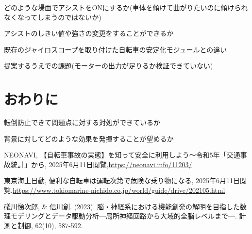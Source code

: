 \documentclass[uplatex,dvipdfmx]{jsarticle}
\begin{document}
どのような場面でアシストをONにするか(車体を傾けて曲がりたいのに傾けられなくなってしまうのではないか)

アシストのしきい値や強さの変更をすることができるか

既存のジャイロスコープを取り付けた自転車の安定化モジュールとの違い

提案するうえでの課題(モーターの出力が足りるか検証できていない)

\section{おわりに}

転倒防止できて問題点に対する対処ができているか

背景に対してどのような効果を発揮することが望めるか




\begin{thebibliography}{9}

 NEONAVI, 【自転車事故の実態】を知って安全に利用しよう～令和5年「交通事故統計」から, 
2025年6月11日閲覧,\url{https://neonavi.info/11203/}

 東京海上日動, 便利な自転車は運転次第で危険な乗り物になる, 
2025年6月11日閲覧,\url{https://www.tokiomarine-nichido.co.jp/world/guide/drive/202105.html}

 礒川悌次郎, \& 信川創. (2023). 脳・神経系における機能創発の解明を目指した数理モデリングとデータ駆動分析―局所神経回路から大域的全脳レベルまで―. 計測と制御, 62(10), 587-592.

\end{thebibliography}
\end{document}
